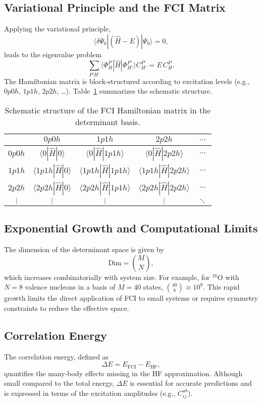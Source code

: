 \subsection{Variational Principle and the FCI Matrix}
Applying the variational principle,
\[
\langle \delta\Psi_0 | (\hat{H} - E) | \Psi_0 \rangle = 0,
\]
leads to the eigenvalue problem
\[
\sum_{P'H'} \langle \Phi_H^P | \hat{H} | \Phi_{H'}^{P'} \rangle C_{H'}^{P'} = E\, C_H^P.
\]
The Hamiltonian matrix is block-structured according to excitation levels (e.g., $0p0h$, $1p1h$, $2p2h$, \dots). Table~\ref{tab:fci_matrix} summarizes the schematic structure.

\begin{table}[h]
\centering
\begin{tabular}{c|cccc}
 & $0p0h$ & $1p1h$ & $2p2h$ & $\dots$ \\
\hline
$0p0h$ & $\langle 0|\hat{H}|0 \rangle$ & $\langle 0|\hat{H}|1p1h \rangle$ & $\langle 0|\hat{H}|2p2h \rangle$ & $\cdots$ \\
$1p1h$ & $\langle 1p1h|\hat{H}|0 \rangle$ & $\langle 1p1h|\hat{H}|1p1h \rangle$ & $\langle 1p1h|\hat{H}|2p2h \rangle$ & $\cdots$ \\
$2p2h$ & $\langle 2p2h|\hat{H}|0 \rangle$ & $\langle 2p2h|\hat{H}|1p1h \rangle$ & $\langle 2p2h|\hat{H}|2p2h \rangle$ & $\cdots$ \\
$\vdots$ & $\vdots$ & $\vdots$ & $\vdots$ & $\ddots$ \\
\end{tabular}
\caption{Schematic structure of the FCI Hamiltonian matrix in the determinant basis.}
\label{tab:fci_matrix}
\end{table}

\subsection{Exponential Growth and Computational Limits}
The dimension of the determinant space is given by
\[
\text{Dim} = \binom{M}{N},
\]
which increases combinatorially with system size. For example, for ${}^{16}\mathrm{O}$ with $N=8$ valence nucleons in a basis of $M=40$ states, $\binom{40}{8} \approx 10^9$. This rapid growth limits the direct application of FCI to small systems or requires symmetry constraints to reduce the effective space.

\subsection{Correlation Energy}
The correlation energy, defined as
\[
\Delta E = E_{\mathrm{FCI}} - E_{\mathrm{HF}},
\]
quantifies the many-body effects missing in the HF approximation. Although small compared to the total energy, $\Delta E$ is essential for accurate predictions and is expressed in terms of the excitation amplitudes (e.g., $C_{ij}^{ab}$).

